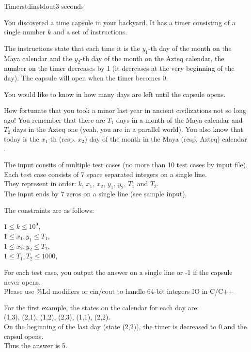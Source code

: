 \begin{problem}{Timer}{stdin}{stdout}{3 seconds}



\par You discovered a time capsule in your backyard. It has a timer consisting of a single number $k$ and a set of instructions.
\par The instructions state that each time it is the $y_1$-th day of the month on the Maya calendar and the $y_2$-th day of the month on the Azteq calendar, the number on the timer decreases by 1 (it decreases at the very beginning of the day). 
The capsule will open when the timer becomes $0$.
\par You would like to know in how many days are left until the capsule opens.


\par How fortunate that you took a minor last year in ancient civilizations not so long ago! You remember that there are $T_1$ days in a month of the Maya calendar and $T_2$ days in the Azteq one (yeah, you are in a parallel world). You also know that today is the $x_1$-th (resp. $x_2$) day of the month in the Maya (resp. Azteq) calendar .


\InputFile

The input consits of multiple test cases (no more than 10 test cases by input file).\\ 
Each test case consists of 7 space separated integers on a single line. \\ 
They represent in order: $k$, $x_1$, $x_2$, $y_1$, $y_2$, $T_1$ and $T_2$. \\ 
The input ends by 7 zeros on a single line (see sample input).\\ 

\par The constraints are as follows:

$1\le k \le 10^9$,\\ 
$1\le x_1,y_1 \le T_1$,\\ 
$1\le x_2,y_2 \le T_2$,\\ 
$1\le T_1,T_2 \le 1000$,\\ 


\OutputFile

For each test case, you output the answer on a single line or -1 if the capsule never opens.\\ 
Please use \%Ld modifiers or cin/cout to handle 64-bit integers IO in C/C++

\Example

\begin{examplewide}
%
\end{examplewide}

For the first example, the states on the calendar for each day are:\\ 
(1,3), (2,1), (1,2), (2,3), (1,1), (2,2).\\
On the beginning of the last day (state (2,2)), the timer is decreased to 0 and the capsul opens.\\ 
Thus the answer is 5.

\end{problem}
